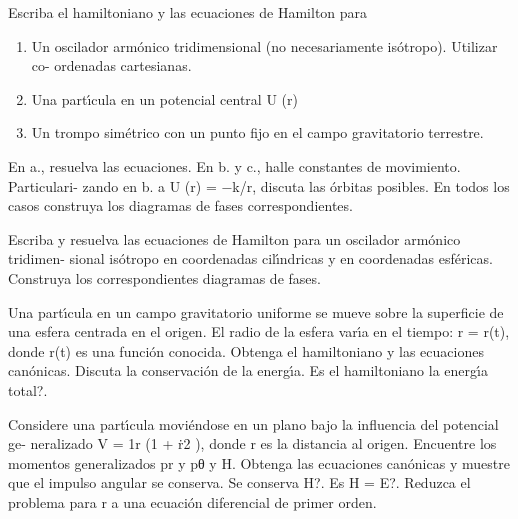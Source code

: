 \documentclass[10pt,oneside]{CBFT_book}
\begin{document}


\begin{ejercicios}

\label{ej1}
\item{ \bf }
Escriba el hamiltoniano y las ecuaciones de Hamilton para
\begin{enumerate}[label=(\alph*)]
\item Un oscilador armónico tridimensional (no necesariamente isótropo). Utilizar co-
ordenadas cartesianas.
\item Una partı́cula en un potencial central U (r)
\item Un trompo simétrico con un punto fijo en el campo gravitatorio terrestre.
\end{enumerate}
En a., resuelva las ecuaciones. En b. y c., halle constantes de movimiento. Particulari-
zando en b. a U (r) = −k/r, discuta las órbitas posibles. En todos los casos construya
los diagramas de fases correspondientes.

\label{ej2}
\item{ \bf }
Escriba y resuelva las ecuaciones de Hamilton para un oscilador armónico tridimen-
sional isótropo en coordenadas cilı́ndricas y en coordenadas esféricas. Construya los
correspondientes diagramas de fases.

\label{ej3}
\item{ \bf }
Una partı́cula en un campo gravitatorio uniforme se mueve sobre la superficie de una
esfera centrada en el origen. El radio de la esfera varı́a en el tiempo: r = r(t), donde
r(t) es una función conocida. Obtenga el hamiltoniano y las ecuaciones canónicas.
Discuta la conservación de la energı́a. Es el hamiltoniano la energı́a total?.

\label{ej4}
\item{ \bf }
Considere una partı́cula moviéndose en un plano bajo la influencia del potencial ge-
neralizado V = 1r (1 + ṙ2 ), donde r es la distancia al origen. Encuentre los momentos
generalizados pr y pθ y H. Obtenga las ecuaciones canónicas y muestre que el impulso
angular se conserva. Se conserva H?. Es H = E?. Reduzca el problema para r a una
ecuación diferencial de primer orden.


\end{ejercicios}
\end{document}
